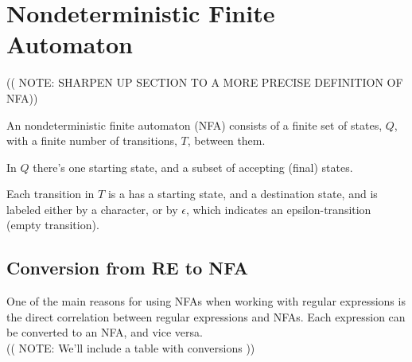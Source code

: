 \section{Nondeterministic Finite Automaton}
(( NOTE: SHARPEN UP SECTION TO A MORE PRECISE DEFINITION OF NFA))

\begin{mydef}
An nondeterministic finite automaton (NFA) consists of a finite set of states, $Q$, with a finite number of transitions, $T$, between them.


In $Q$ there's one starting state, and a subset of accepting (final) states.

Each transition in $T$ is a has a starting state, and a destination state, and is labeled either by a character, or by $\epsilon$, which indicates an epsilon-transition (empty transition).
\end{mydef}

\subsection{Conversion from RE to NFA}
\label{RA_TO_NFA}
One of the main reasons for using NFAs when working with regular expressions is the direct correlation between regular expressions and NFAs. Each expression can be converted to an NFA, and vice versa.
\\
(( NOTE: We'll include a table with conversions ))
\\

